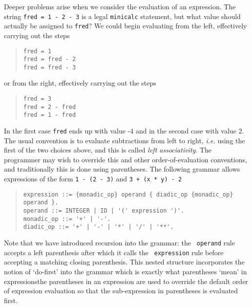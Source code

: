 {Deeper problems arise when we consider the evaluation of an expression.
The string \verb|fred = 1 - 2 - 3| is a legal {\tt minicalc} statement, but what
value should actually be assigned to {\tt fred}? We could begin evaluating
from the left, effectively carrying out the steps
\begin{quote}
\small
\begin{verbatim}
fred = 1
fred = fred - 2
fred = fred - 3
\end{verbatim}
\end{quote}
or from the right, effectively carrying out the steps
\begin{quote}
\small
\begin{verbatim}
fred = 3
fred = 2 - fred
fred = 1 - fred
\end{verbatim}
\end{quote}
In the first case {\tt fred} ends up with value -4 and in the second
case with value 2. The usual convention is to evaluate subtractions from
left to right, {\em i.e.} using the first of the two choices above, and this is
called {\em left associativity}.
The programmer may wish to override this and other order-of-evaluation
conventions, and traditionally this is done using parentheses.
The following grammar allows expressions of
the form \verb|1 - (2 - 3)| and \verb|3 + (x * y) - 2|

\begin{quote}
\small
\begin{verbatim}
expression ::= {monadic_op} operand { diadic_op {monadic_op} operand }.
operand ::= INTEGER | ID | '(' expression ')'.
monadic_op ::= '+' | '-'.
diadic_op ::= '+' | '-' | '*' | '/' | '**'.
\end{verbatim}
\end{quote}

Note that we have introduced recursion into the grammar: the {\tt
operand} rule accepts a left parenthesis after which it calls the {\tt
expression} rule before accepting a matching closing parenthesis. This
nested structure incorporates the notion of `do-first' into the grammar
which is exactly what parentheses `mean' in expressions\dash the
parentheses in an expression are used to override the default order of
expression evaluation so that the sub-expression in parentheses is
evaluated first.

}
